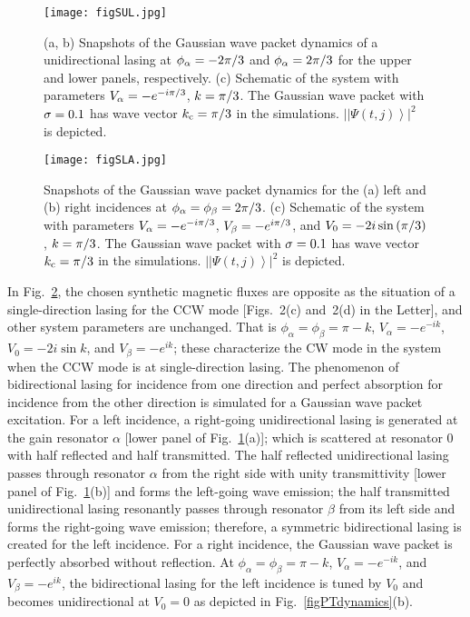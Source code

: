 \documentclass[prl,showpacs,superscriptaddress,twocolumn]{revtex4-1}
\begin{document}
\begin{widetext}
\begin{figure}[thb]
\centering\texttt{[image: figSUL.jpg]}
\caption{(a, b) Snapshots of the Gaussian wave packet dynamics of a unidirectional
lasing at $\protect\phi _{\protect\alpha }=-2\protect\pi /3$ and $\protect\phi _{\protect\alpha }=2\protect\pi /3$ for the upper and lower panels,
respectively. (c) Schematic of the system with parameters $V_{\protect\alpha }=-e^{-i\protect\pi /3}$, $k=\protect\pi/3$. The Gaussian wave packet with $\protect\sigma =0.1$ has wave vector $k_{\mathrm{c}}=\protect\pi /3$ in the
simulations. $\left\vert \left\vert \Psi \left( t,j\right)
\right\rangle \right\vert ^{2}$ is depicted.} \label{figUL}
\end{figure}

\begin{figure}[thb]
\centering\texttt{[image: figSLA.jpg]}
\caption{Snapshots of the Gaussian wave packet dynamics for the (a) left and
(b) right incidences at $\protect\phi _{\protect\alpha }=\protect\phi _{\protect\beta }=2\protect\pi /3$. (c) Schematic of the system with
parameters $V_{\protect\alpha }=-e^{-i\protect\pi /3}$, $V_{\protect\beta }=-e^{i\protect\pi /3}$, and $V_{0}=-2i\sin \left( \protect\pi /3\right) $, $k=\protect\pi/3$. The Gaussian wave packet with $\protect\sigma =0.1$ has
wave vector $k_{\mathrm{c}}=\protect\pi /3$ in the simulations. $\left\vert \left\vert \Psi \left( t,j\right) \right\rangle
\right\vert ^{2}$ is depicted.} \label{figLaserAbsorber}
\end{figure}

In Fig.~\ref{figLaserAbsorber}, the chosen synthetic
magnetic fluxes are opposite as the situation of a single-direction lasing
for the CCW mode [Figs.~2(c) and~2(d) in the Letter], and other system
parameters are unchanged. That is $\phi _{\alpha }=\phi _{\beta }=\pi -k$, $%
V_{\alpha }=-e^{-ik}$, $V_{0}=-2i\sin k$, and $V_{\beta }=-e^{ik}$; these
characterize the CW mode in the system when the CCW mode is at
single-direction lasing. The phenomenon of bidirectional lasing for
incidence from one direction and perfect absorption for incidence from the
other direction is simulated for a Gaussian wave packet excitation. For a
left incidence, a right-going unidirectional lasing is generated at the gain
resonator $\alpha $ [lower panel of Fig.~\ref{figUL}(a)];
which is scattered at resonator $0$ with half reflected and half
transmitted. The half reflected unidirectional lasing passes through
resonator $\alpha $ from the right side with unity transmittivity [lower
panel of Fig.~\ref{figUL}(b)] and forms the left-going wave
emission; the half transmitted unidirectional lasing resonantly passes
through resonator $\beta $ from its left side and forms the right-going wave
emission; therefore, a symmetric bidirectional lasing is created for the
left incidence. For a right incidence, the Gaussian wave packet is perfectly
absorbed without reflection. At $\phi _{\alpha }=\phi _{\beta }=\pi -k$, $%
V_{\alpha }=-e^{-ik}$, and $V_{\beta }=-e^{ik}$, the bidirectional lasing
for the left incidence is tuned by $V_{0}$ and becomes unidirectional at $%
V_{0}=0$ as depicted in Fig.~\ref{figPTdynamics}(b).


\end{widetext}
\end{document}
